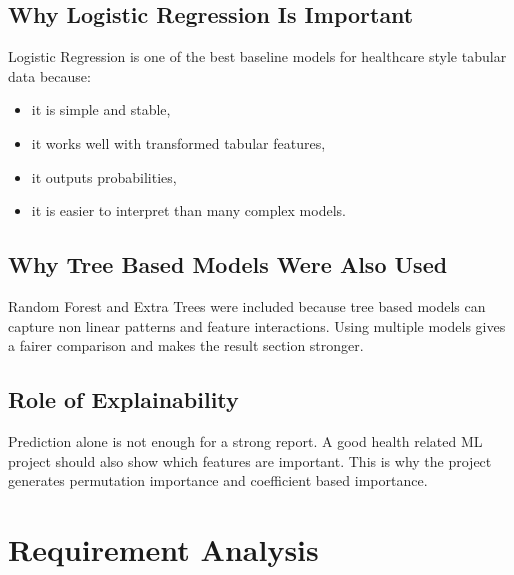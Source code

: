 \documentclass[12pt,a4paper,openany]{report}
\begin{document}
    \section{Why Logistic Regression Is Important}
    Logistic Regression is one of the best baseline models for healthcare style tabular data because:
    \begin{itemize}[leftmargin=1.4cm]
    \item it is simple and stable,
    \item it works well with transformed tabular features,
    \item it outputs probabilities,
    \item it is easier to interpret than many complex models.
    \end{itemize}

    \section{Why Tree Based Models Were Also Used}
    Random Forest and Extra Trees were included because tree based models can capture non linear patterns and feature interactions. Using multiple models gives a fairer comparison and makes the result section stronger.

    \section{Role of Explainability}
    Prediction alone is not enough for a strong report. A good health related ML project should also show which features are important. This is why the project generates permutation importance and coefficient based importance.

    \chapter{Requirement Analysis}
\end{document}
